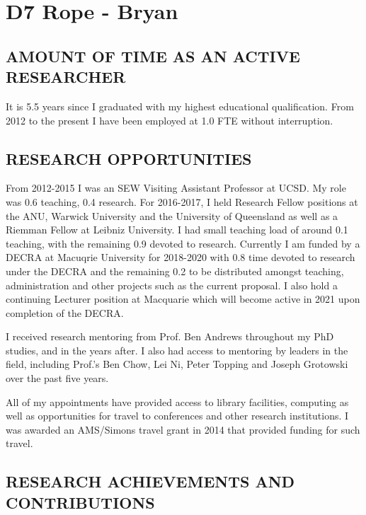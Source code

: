\documentclass[12pt]{article}
\author{Paul Bryan}
\date{}
\title{}
\begin{document}
\section*{D7 Rope - Bryan}
\label{sec:orgheadline9}

\subsection*{AMOUNT OF TIME AS AN ACTIVE RESEARCHER}
\label{sec:orgheadline1}

It is 5.5 years since I graduated with my highest educational qualification. From 2012 to the present I have been employed at 1.0 FTE without interruption. 

\subsection*{RESEARCH OPPORTUNITIES}
\label{sec:orgheadline2}

From 2012-2015 I was an SEW Visiting Assistant Professor at UCSD. My role was 0.6 teaching, 0.4 research. For 2016-2017, I held Research Fellow positions at the ANU, Warwick University and the University of Queensland as well as a Riemman Fellow at Leibniz University. I had small teaching load of around 0.1 teaching, with the remaining 0.9 devoted to research. Currently I am funded by a DECRA at Macuqrie University for 2018-2020 with 0.8 time devoted to research under the DECRA and the remaining 0.2 to be distributed amongst teaching, administration and other projects such as the current proposal. I also hold a continuing Lecturer position at Macquarie which will become active in 2021 upon completion of the DECRA.

I received research mentoring from Prof. Ben Andrews throughout my PhD studies, and in the years after. I also had access to mentoring by leaders in the field, including Prof.'s Ben Chow, Lei Ni, Peter Topping and Joseph Grotowski over the past five years.

All of my appointments have provided access to library facilities, computing as well as opportunities for travel to conferences and other research institutions. I was awarded an AMS/Simons travel grant in 2014 that provided funding for such travel.

\subsection*{RESEARCH ACHIEVEMENTS AND CONTRIBUTIONS}
\label{sec:orgheadline8}
\end{document}
